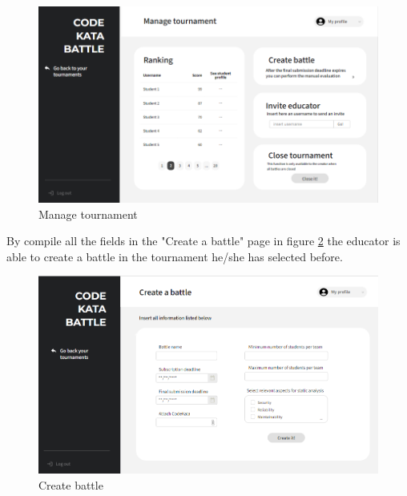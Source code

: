 \begin{figure}[h]
    \centering
    \includegraphics[width=\textwidth]{images/mockups/educators/ManageTournament.png}
    \caption{Manage tournament}
    \label{fig:manageT}
\end{figure}
\clearpage

By compile all the fields in the "Create a battle" page in figure \ref{fig:createB} the educator is able to create a battle in the tournament he/she has selected before.
\begin{figure}[h]
    \centering
    \includegraphics[width=\textwidth]{images/mockups/educators/createB.png}
    \caption{Create battle}
    \label{fig:createB}
\end{figure}

